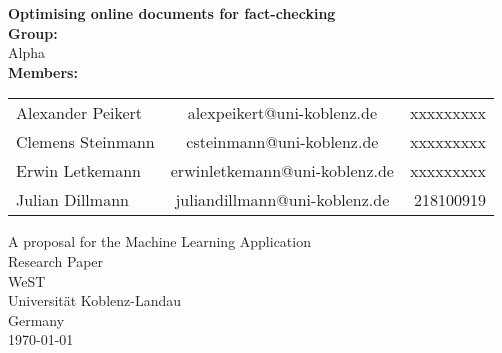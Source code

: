 \documentclass[11pt]{article}
\begin{document}
\begin{titlepage}
\begin{center}
\textbf{\large Optimising online documents for fact-checking}\\
\vspace{15mm}
\textbf{Group:}\\
\vspace{2mm}
Alpha \\
\vspace{15mm}
\textbf {Members:}\\
\vspace{2mm}
\end{center}
\begin{tabular}{ l c r }
  Alexander Peikert & alexpeikert@uni-koblenz.de & xxxxxxxxx \\
  Clemens Steinmann & csteinmann@uni-koblenz.de & xxxxxxxxx \\
  Erwin Letkemann & erwinletkemann@uni-koblenz.de & xxxxxxxxx \\
  Julian	Dillmann & juliandillmann@uni-koblenz.de & 218100919 \\
\end{tabular}
\vfill
\begin{center}
A proposal for the Machine Learning Application\\
Research Paper\\
\vspace{8mm}
WeST \\
Universität Koblenz-Landau \\
Germany \\
\vspace{2mm}
\today
\clearpage
\end{center}
\end{titlepage}
\end{document}
